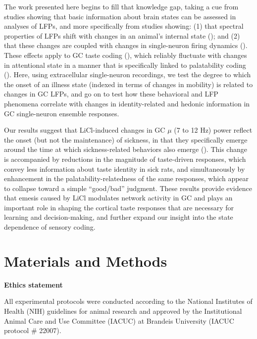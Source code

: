 \begin{refsection}
The work presented here begins to fill that knowledge gap, taking a cue from studies showing that basic information about brain states can be assessed in analyses of LFPs, and more specifically from studies showing: (1) that spectral properties of LFPs shift with changes in an animal’s internal state (\cite{ching2014a,cimenser2011a}); and (2) that these changes are coupled with changes in single-neuron firing dynamics (\cite{olcese2018a,lee2012a,canolty2012a}). These effects apply to GC taste coding (\cite{fontanini2005a}), which reliably fluctuate with changes in attentional state in a manner that is specifically linked to palatability coding (\cite{fontanini2006a}). Here, using extracellular single-neuron recordings, we test the degree to which the onset of an illness state (indexed in terms of changes in mobility) is related to changes in GC LFPs, and go on to test how these behavioral and LFP phenomena correlate with changes in identity-related and hedonic information in GC single-neuron ensemble responses.

Our results suggest that LiCl-induced changes in GC \(\mu\) (7 to 12 Hz) power reflect the onset (but not the maintenance) of sickness, in that they specifically emerge around the time at which sickness-related behaviors also emerge (\cite{parker1982a,nachman1963a,nachman1973a,towers-a,kent1992a}). This change is accompanied by reductions in the magnitude of taste-driven responses, which convey less information about taste identity in sick rats, and simultaneously by enhancement in the palatability-relatedness of the same responses, which appear to collapse toward a simple “good/bad” judgment. These results provide evidence that emesis caused by LiCl modulates network activity in GC and plays an important role in shaping the cortical taste responses that are necessary for learning and decision-making, and further expand our insight into the state dependence of sensory coding.

\section{Materials and Methods}

\smallskip
\noindent\textbf{Ethics statement}\par
\noindent 
All experimental protocols were conducted according to the National Institutes of Health (NIH) guidelines for animal research and approved by the Institutional Animal Care and Use Committee (IACUC) at Brandeis University (IACUC protocol \# 22007).


\end{refsection}
